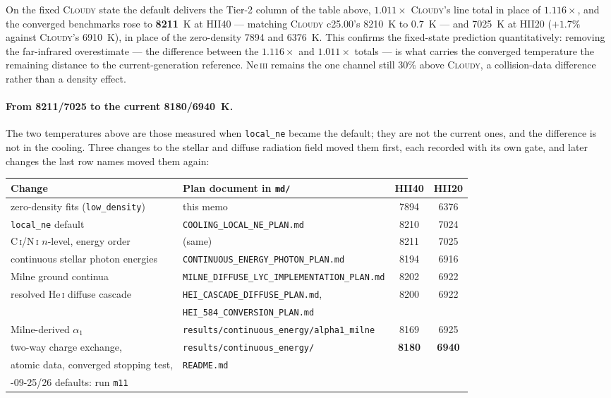 \documentclass[english,a4paper]{my_memo}
\newcommand{\code}[1]{\texttt{#1}}
\newcommand{\Cloudy}{\textsc{Cloudy}}
\newcommand{\HeI}{He\,\textsc{i}}
\newcommand{\NI}{N\,\textsc{i}}
\newcommand{\CI}{C\,\textsc{i}}
\newcommand{\NeIII}{Ne\,\textsc{iii}}
\begin{document}
On the fixed \Cloudy{} state the default delivers the Tier-2 column of the
table above, $1.011\times$ \Cloudy{}'s line total in place of $1.116\times$,
and the converged benchmarks rose to \textbf{8211}~K at HII40 --- matching
\Cloudy{} c25.00's 8210~K to $0.7$~K --- and 7025~K at HII20 ($+1.7\%$ against
\Cloudy{}'s 6910~K), in place of the zero-density 7894 and 6376~K.  This
confirms the fixed-state prediction quantitatively: removing the far-infrared
overestimate --- the difference between the $1.116\times$ and $1.011\times$
totals --- is what carries the converged temperature the remaining distance to
the current-generation reference.  \NeIII{} remains the one channel still $30\%$
above \Cloudy{}, a collision-data difference rather than a density effect.

\paragraph{From 8211/7025 to the current 8180/6940~K.}  The two temperatures
above are those measured when \code{local\_ne} became the default; they are not
the current ones, and the difference is not in the cooling.  Three changes to
the stellar and diffuse radiation field moved them first, each recorded with its
own gate, and later changes the last row names moved them again:

\begin{center}
\footnotesize
\begin{tabular}{llcc}
\toprule
Change & Plan document in \code{md/} & HII40 & HII20 \\
\midrule
zero-density fits (\code{low\_density})   & this memo & 7894 & 6376 \\
\code{local\_ne} default                  & \code{COOLING\_LOCAL\_NE\_PLAN.md} & 8210 & 7024 \\
\CI{}/\NI{} $n$-level, energy order       & (same) & 8211 & 7025 \\
continuous stellar photon energies        & \code{CONTINUOUS\_ENERGY\_PHOTON\_PLAN.md} & 8194 & 6916 \\
Milne ground continua                     & \code{MILNE\_DIFFUSE\_LYC\_IMPLEMENTATION\_PLAN.md} & 8202 & 6922 \\
resolved \HeI{} diffuse cascade           & \code{HEI\_CASCADE\_DIFFUSE\_PLAN.md}, & 8200 & 6922 \\
                                          & \code{HEI\_584\_CONVERSION\_PLAN.md} & & \\
Milne-derived $\alpha_1$                  & \code{results/\allowbreak continuous\_energy/alpha1\_milne} & 8169 & 6925 \\
two-way charge exchange,                  & \code{results/\allowbreak continuous\_energy/} & \textbf{8180} & \textbf{6940} \\
\quad atomic data, converged stopping test, & \quad\code{README.md} & & \\
\quad 2026-09-25/26 defaults: run \code{m11} & & & \\
\bottomrule
\end{tabular}
\end{center}
\end{document}

